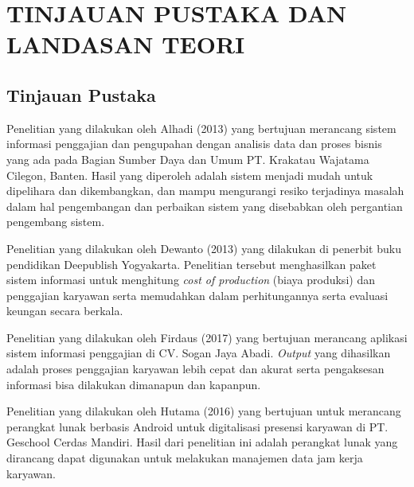 
\chapter{TINJAUAN PUSTAKA DAN LANDASAN TEORI}                

\section{Tinjauan Pustaka}
  Penelitian yang dilakukan oleh Alhadi (2013) yang bertujuan merancang sistem informasi penggajian dan pengupahan dengan analisis data dan proses bisnis yang ada pada Bagian Sumber Daya dan Umum PT. Krakatau Wajatama Cilegon, Banten. Hasil yang diperoleh adalah sistem menjadi mudah untuk dipelihara dan dikembangkan, dan mampu mengurangi resiko terjadinya masalah dalam hal pengembangan dan perbaikan sistem yang disebabkan oleh pergantian pengembang sistem.

  Penelitian yang dilakukan oleh Dewanto (2013) yang dilakukan di penerbit buku pendidikan Deepublish Yogyakarta. Penelitian tersebut menghasilkan paket sistem informasi untuk menghitung \emph{cost of production} (biaya produksi) dan penggajian karyawan serta memudahkan dalam perhitungannya serta evaluasi keungan secara berkala.

  Penelitian yang dilakukan oleh Firdaus (2017) yang bertujuan merancang aplikasi sistem informasi penggajian di CV. Sogan Jaya Abadi. \emph{Output} yang dihasilkan adalah proses penggajian karyawan lebih cepat dan akurat serta pengaksesan informasi bisa dilakukan dimanapun dan kapanpun.
  
  Penelitian yang dilakukan oleh Hutama (2016) yang bertujuan untuk merancang perangkat lunak berbasis Android untuk digitalisasi presensi karyawan di PT. Geschool Cerdas Mandiri. Hasil dari penelitian ini adalah perangkat lunak yang dirancang dapat digunakan untuk melakukan manajemen data jam kerja karyawan.
  
